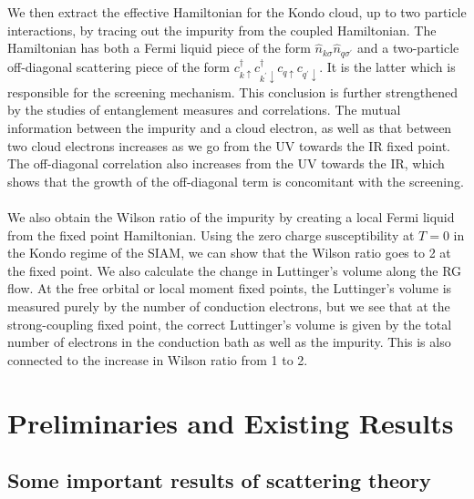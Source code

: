 \documentclass[twoside,11pt]{report}
\numberwithin{equation}{section}
\begin{document}
\\\\We then extract the effective Hamiltonian for the Kondo cloud, up to two particle interactions, by tracing out the impurity from the coupled Hamiltonian. The Hamiltonian has both a Fermi liquid piece of the form \(\hat n_{k\sigma}\hat n_{q\sigma^\prime}\) and a two-particle off-diagonal scattering piece of the form \(c^\dagger_{k \uparrow}c^\dagger_{k^\prime \downarrow}c_{q \uparrow}c_{q^\prime \downarrow}\). It is the latter which is responsible for the screening mechanism. This conclusion is further strengthened by the studies of entanglement measures and correlations. The mutual information between the impurity and a cloud electron, as well as that between two cloud electrons increases as we go from the UV towards the IR fixed point. The off-diagonal correlation also increases from the UV towards the IR, which shows that the growth of the off-diagonal term is concomitant with the screening.
\\\\We also obtain the Wilson ratio of the impurity by creating a local Fermi liquid from the fixed point Hamiltonian. Using the zero charge susceptibility at \(T=0\) in the Kondo regime of the SIAM, we can show that the Wilson ratio goes to 2 at the fixed point. We also calculate the change in Luttinger's volume along the RG flow. At the free orbital or local moment fixed points, the Luttinger's volume is measured purely by the number of conduction electrons, but we see that at the strong-coupling fixed point, the correct Luttinger's volume is given by the total number of electrons in the conduction bath as well as the impurity. This is also connected to the increase in Wilson ratio from 1 to 2.
\chapter{Preliminaries and Existing Results}\label{prelims}
\section{Some important results of scattering theory}
\end{document}
